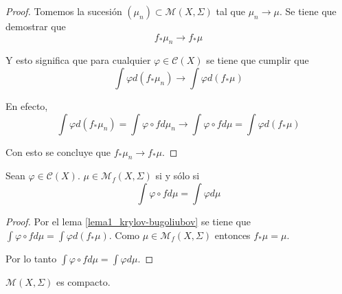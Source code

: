\begin{proof}
	Tomemos la sucesión $(\mu_n) \subset \mathcal{M}(X,\Sigma)$ tal que $\mu_n \rightarrow \mu$. Se tiene que demostrar que
	\begin{equation}
		f_* \mu_n \rightarrow f_* \mu
	\end{equation}
	
	Y esto significa que para cualquier $\varphi \in \mathcal{C}(X)$ se tiene que cumplir que
	\begin{equation}
		\int \varphi d(f_* \mu_n) \rightarrow \int \varphi d(f_* \mu)
	\end{equation}
	
	En efecto,
	\begin{equation}
		\int \varphi d(f_* \mu_n) = \int \varphi \circ f d\mu_n \rightarrow \int \varphi \circ f d\mu = \int \varphi d(f_* \mu)
	\end{equation}
	
	Con esto se concluye que $f_* \mu_n \rightarrow f_* \mu$.
\end{proof}

\begin{lema}\label{lema3_krylov}
	Sean $\varphi \in \mathcal{C}(X)$. $\mu \in \mathcal{M}_f(X,\Sigma)$ si y sólo si	
	\begin{equation}
		\int \varphi \circ f d\mu = \int \varphi d\mu
	\end{equation}
\end{lema}

\begin{proof}
	Por el lema \ref{lema1_krylov-bugoliubov} se tiene que $\int \varphi \circ f d\mu = \int \varphi d(f_* \mu)$. Como $\mu \in \mathcal{M}_f(X,\Sigma)$ entonces $f_* \mu = \mu$.
	
	Por lo tanto $\int \varphi \circ f d\mu = \int \varphi d\mu$.
\end{proof}

\begin{lema}\label{krylov-bugoliubov-lema3}
	$\mathcal{M}(X,\Sigma)$ es compacto. 
\end{lema}

